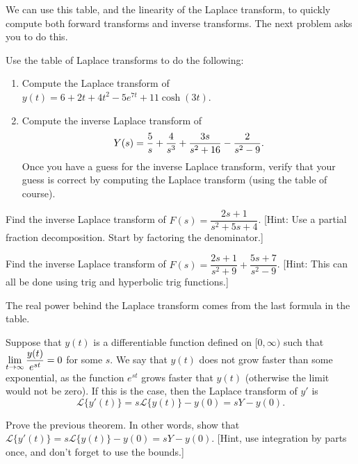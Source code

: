 We can use this table, and the linearity of the Laplace transform, to quickly compute both forward transforms and inverse transforms.  The next problem asks you to do this.
\begin{problem}
 Use the table of Laplace transforms to do the following:
\begin{enumerate}
 \item Compute the Laplace transform of $y(t) = 6+2t+4t^2-5e^{7t}+11\cosh(3t)$. 
 \item Compute the inverse Laplace transform of $$\displaystyle Y(s) = \frac{5}{s}+\frac{4}{s^3}+\frac{3s}{s^2+16}-\frac{2}{s^2-9}.$$ Once you have a guess for the inverse Laplace transform, verify that your guess is correct by computing the Laplace transform (using the table of course).
\end{enumerate}
\end{problem}

\begin{problem}
Find the inverse Laplace transform of $F(s) = \dfrac{2s+1}{s^2+5s+4}$.  [Hint: Use a partial fraction decomposition. Start by factoring the denominator.]
\end{problem}

\begin{problem}
Find the inverse Laplace transform of $F(s) = \dfrac{2s+1}{s^2+9} + \dfrac{5s+7}{s^2-9}$.  [Hint: This can all be done using trig and hyperbolic trig functions.]
\end{problem}



The real power behind the Laplace transform comes from the last formula in the table. 
\begin{theorem} \label{laplace transform of a derivative}
 Suppose that $y(t)$ is a differentiable function defined on $[0,\infty)$ such that $\displaystyle\lim_{t\to \infty}\frac{y(t)}{e^{st}}=0$ for some $s$. We say that $y(t)$ does not grow faster than some exponential, as the function $e^{st}$ grows faster that $y(t)$ (otherwise the limit would not be zero).  If this is the case, then the Laplace transform of $y'$ is
 $$\mathscr{L}\{y'(t)\} = s \mathscr{L}\{y(t)\} - y(0) = sY - y(0).$$
\end{theorem}

\begin{problem}
 Prove the previous theorem.  In other words, show that $\mathscr{L}\{y'(t)\} = s \mathscr{L}\{y(t)\} - y(0) = sY - y(0).$  [Hint, use integration by parts once, and don't forget to use the bounds.]
\end{problem}

